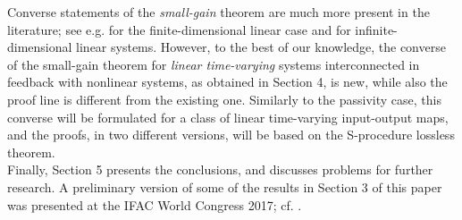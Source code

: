 \documentclass[11pt]{article}
\begin{document}
Converse statements of the {\it small-gain} theorem are much more present in the literature; see e.g. \cite[Theorem 9.1]{ZDG} for the
finite-dimensional linear case and \cite{CZ} for infinite-dimensional linear systems. However, to the best of our knowledge, the converse of the small-gain theorem for {\it linear time-varying} systems interconnected in feedback with nonlinear systems, as obtained in Section 4, is new, while also the proof line is different from the existing one. Similarly to the passivity case, this converse will be formulated for a class of linear time-varying input-output maps, and the proofs, in two
different
versions, will be based on the S-procedure lossless theorem. \\
Finally, Section 5 presents the conclusions, and discusses problems for further research.
A preliminary version of some of the results in Section 3 of this paper was presented at the IFAC World Congress 2017; cf. \cite{Kho-Sch16}.
\end{document}
